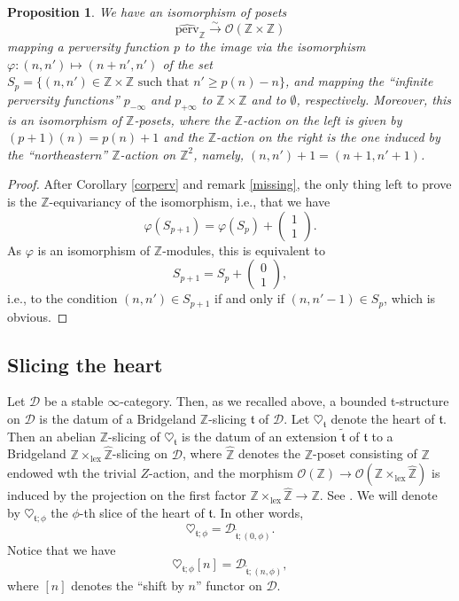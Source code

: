 \documentclass{article}
\newtheorem{prop}[thm]{Proposition}
\theoremstyle{definition}
\newcommand{\Z}{\mathbb{Z}}
\newcommand{\Oo}{\mathcal{O}}
\newcommand{\tee}{\mathfrak{t}}
\begin{document}
\begin{prop}
\label{prop-perv}
We have an isomorphism of posets
\[
\widehat{\mathrm{perv}}_\Z\xrightarrow{\sim} \Oo(\Z\times \Z)
\]
mapping a perversity function $p$ to the image via the isomorphism $\varphi\colon (n,n')\mapsto (n+n',n')$ of the set $S_p=\{(n,n')\in \Z\times \Z\text{ such that } n'\geq p(n)-n\}$, and mapping the ``infinite perversity functions'' $p_{-\infty}$ and $p_{+\infty}$ to $\Z\times \Z$ and to $\emptyset$, respectively. Moreover, this is an isomorphism of $\Z$-posets, where the $\Z$-action on the left is given by $(p+1)(n)=p(n)+1$ and the $\Z$-action on the right is the one induced by the ``northeastern'' $\Z$-action on $\Z^2$, namely, $(n,n')+1=(n+1,n'+1)$. 
\end{prop}
\begin{proof}
After Corollary \ref{corperv} and remark \ref{missing}, the only thing left to prove is the $\Z$-equivariancy of the isomorphism, i.e., that we have
\[
\varphi(S_{p+1})=\varphi(S_p)+\left(\begin{smallmatrix}1\\1\end{smallmatrix}\right).
\]
As $\varphi$ is an isomorphism of $\Z$-modules, this is equivalent to
\[
S_{p+1}=S_p+\left(\begin{smallmatrix}0\\1\end{smallmatrix}\right),
\]
i.e., to the condition $(n,n')\in S_{p+1}$ if and only if $(n,n'-1)\in S_{p}$, which is obvious.

\end{proof}


\subsection{Slicing the heart}
Let $\mathscr{D}$ be a stable $\infty$-category. Then, as we recalled above, a bounded t-structure on $\mathscr{D}$ is the datum of a Bridgeland $\Z$-slicing $\tee$ of $\mathscr{D}$. Let $\heartsuit_{\mathfrak{t}}$ denote the heart of $\mathfrak{t}$. Then an abelian $\Z$-slicing of $\heartsuit_{\mathfrak{t}}$ is the datum of an extension $\tilde{\tee}$ of $\tee$ to a Bridgeland $\Z\times_{\mathrm{lex}}\hat{\Z}$-slicing on $\mathscr{D}$, where $\hat{\Z}$ denotes the $\Z$-poset consisting of $\Z$ endowed wth the trivial $Z$-action, and the morphism $\Oo(\Z)\to \Oo(\Z\times_{\mathrm{lex}}\hat{\Z})$ is induced by the projection on the first factor $\Z\times_{\mathrm{lex}}\hat{\Z}\to \Z$. See \cite[Section??]{??}. We will denote by $\heartsuit_{\tee;\phi}$ the $\phi$-th slice of the heart of $\tee$. In other words,
\[
\heartsuit_{\tee;\phi}=\mathscr{D}_{\tilde{\tee};(0,\phi)}.
\]
Notice that we have
\[
\heartsuit_{\tee;\phi}[n]=\mathscr{D}_{\tilde{\tee};(n,\phi)},
\]
where $[n]$ denotes the ``shift by $n$'' functor on $\mathscr{D}$.
\end{document}
